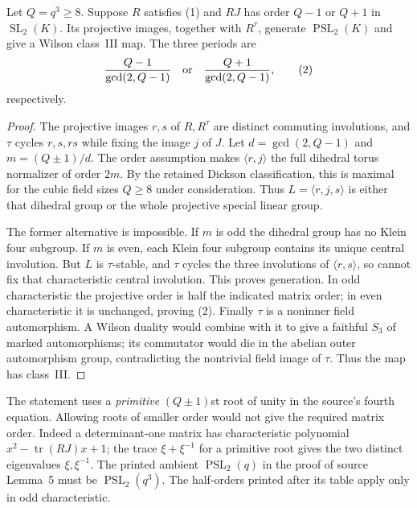 \documentclass[11pt,a4paper]{article}
\newcommand{\SL}{\operatorname{SL}}
\begin{document}
\begin{proposition}
Let $Q=q^3\geq8$. Suppose $R$ satisfies (1) and $RJ$ has order
$Q-1$ or $Q+1$ in $\SL_2(K)$. Its projective images, together with
$R^\tau$, generate $\operatorname{PSL}_2(K)$ and give a Wilson
class~III map. The three periods are
\[
                \frac{Q-1}{\gcd(2,Q-1)}
 \quad\hbox{or}\quad
                \frac{Q+1}{\gcd(2,Q-1)},                \tag{2}
\]
respectively.
\end{proposition}
\begin{proof}
The projective images $r,s$ of $R,R^\tau$ are distinct commuting
involutions, and $\tau$ cycles $r,s,rs$ while fixing the image $j$
of $J$. Let $d=\gcd(2,Q-1)$ and $m=(Q\pm1)/d$. The order
assumption makes $\langle r,j\rangle$ the full dihedral torus
normalizer of order $2m$. By the retained Dickson classification,
this is maximal for the cubic field sizes $Q\geq8$ under consideration.
Thus $L=\langle r,j,s\rangle$ is either that dihedral group or the
whole projective special linear group.

The former alternative is impossible. If $m$ is odd the dihedral group
has no Klein four subgroup. If $m$ is even, each Klein four subgroup
contains its unique central involution. But $L$ is $\tau$-stable, and
$\tau$ cycles the three involutions of $\langle r,s\rangle$, so
cannot fix that characteristic central involution. This proves generation.
In odd characteristic the projective order is half the indicated matrix
order; in even characteristic it is unchanged, proving (2).
Finally $\tau$ is a noninner field automorphism. A Wilson duality would
combine with it to give a faithful $S_3$ of marked automorphisms; its
commutator would die in the abelian outer automorphism group, contradicting
the nontrivial field image of $\tau$. Thus the map has class~III.
\end{proof}
The statement uses a \emph{primitive} $(Q\pm1)$st root of unity in the
source's fourth equation. Allowing roots of smaller order would not give
the required matrix order. Indeed a determinant-one matrix has characteristic
polynomial $x^2-\operatorname{tr}(RJ)x+1$; the trace $\xi+\xi^{-1}$
for a primitive root gives the two distinct eigenvalues $\xi,\xi^{-1}$.
The printed ambient $\operatorname{PSL}_2(q)$ in the proof of source
Lemma~5 must be $\operatorname{PSL}_2(q^3)$. The half-orders printed after
its table apply only in odd characteristic.
\end{document}
